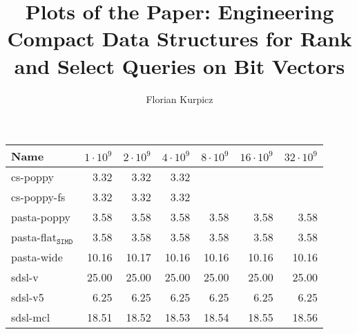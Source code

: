 \documentclass[a4paper,UKenglish,cleveref, autoref, thm-restate]{lipics-v2021}
\title{Plots of the Paper: Engineering Compact Data Structures for Rank and Select Queries on Bit Vectors} %
\author{Florian Kurpicz}{Karlsruhe Institute of Technology, Germany \and \url{https://kurpicz.org}}{kurpicz@kit.edu}{https://orcid.org/0000-0002-2379-9455}{}%
\begin{document}
\maketitle


\begin{table}
  \centering
  \begin{tabular}{lrrrrrr}
    \toprule
    Name & \(1\cdot 10^9\) & \(2\cdot 10^9\) & \(4\cdot 10^9\) & \(8\cdot 10^9\) & \(16\cdot 10^9\) & \(32\cdot 10^9\)\\
    \midrule
    cs-poppy &  3.32 &  3.32 &  3.32 &       &       &       \\
    cs-poppy-fs &  3.32 &  3.32 &  3.32 &       &       &       \\
    pasta-poppy &  3.58 &  3.58 &  3.58 &  3.58 &  3.58 &  3.58 \\
    pasta-flat\(_{\texttt{SIMD}}\)&  3.58 &  3.58 &  3.58 &  3.58 &  3.58 &  3.58 \\
    \midrule
    pasta-wide & 10.16 & 10.17 & 10.16 & 10.16 & 10.16 & 10.16 \\
    sdsl-v & 25.00 & 25.00 & 25.00 & 25.00 & 25.00 & 25.00 \\
    sdsl-v5 &  6.25 &  6.25 &  6.25 &  6.25 &  6.25 &  6.25 \\
    \midrule
    sdsl-mcl & 18.51 & 18.52 & 18.53 & 18.54 & 18.55 & 18.56 \\

\end{tabular}
\end{table}
\end{document}
